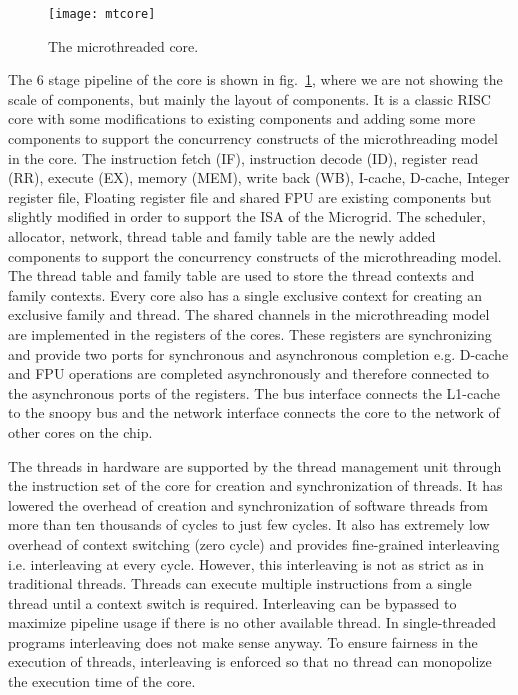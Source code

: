 \documentclass{article}
\begin{document}
\begin{figure}

\begin{centering}

\texttt{[image: mtcore]}
 
\caption{\label{fig:mtcore}The microthreaded core.}

\end{centering}

\end{figure}

The 6 stage pipeline of the core is shown in fig.~\ref{fig:mtcore}, where we are
not showing the scale of components, but mainly the layout of components. It is
a classic RISC core with some modifications to existing components and adding
some more components to support the concurrency constructs of the
microthreading model in the core. The instruction fetch (IF), instruction
decode (ID), register read (RR), execute (EX), memory (MEM), write back (WB),
I-cache, D-cache, Integer register file, Floating register file and shared
FPU are existing components but slightly modified in order to support the ISA
of the Microgrid. The scheduler, allocator, network, thread table and family
table are the newly added components to support the concurrency constructs of
the microthreading model. The thread table and family table are used to store
the thread contexts and family contexts. Every core also has a single exclusive
context for creating an exclusive family and thread. The shared channels in the
microthreading model are implemented in the registers of the cores. These
registers are synchronizing and provide two ports for synchronous and
asynchronous completion e.g. D-cache and FPU operations are completed
asynchronously and therefore connected to the asynchronous ports of the
registers. The bus interface connects the L1-cache to the snoopy bus and the
network interface connects the core to the network of other cores on the
chip.

The threads in hardware are supported by the thread management unit through the
instruction set of the core for creation and synchronization of threads. It has
lowered the overhead of creation and synchronization of software threads from
more than ten thousands of cycles to just few cycles. It also has extremely
low overhead of context switching (zero cycle) and provides fine-grained
interleaving i.e. interleaving at every cycle. However, this interleaving is
not as strict as in traditional threads. Threads can execute multiple
instructions from a single thread until a context switch is required.
Interleaving can be bypassed to maximize pipeline usage if there is no other
available thread. In single-threaded programs interleaving does not make sense
anyway. To ensure fairness in the execution of threads, interleaving is
enforced so that no thread can monopolize the execution time of the core.
\end{document}
